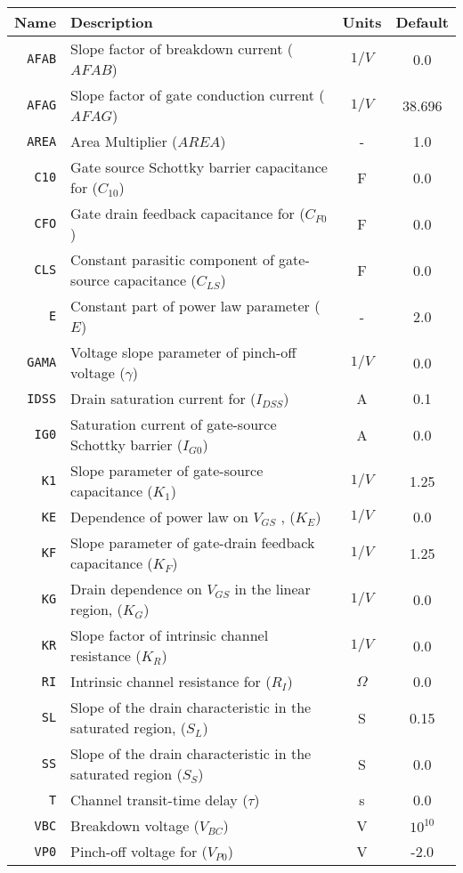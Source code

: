 \documentclass{article}
\begin{document}
\begin{tabular}{|r|l|c|c|}
\hline
\textbf{Name} & \textbf{Description} & \textbf{Units} & \textbf{Default} \\
\hline
\texttt{AFAB} & Slope factor of breakdown current ($AFAB$) & $1/V$ & 0.0 \\
\hline
\texttt{AFAG} & Slope factor of gate conduction current ($AFAG$) & $1/V$ & 38.696 \\
\hline
\texttt{AREA} & Area Multiplier ($AREA$) & - & 1.0 \\
\hline
\texttt{C10} & Gate source Schottky barrier capacitance for ($C_{10}$) & F & 0.0 \\
\hline
\texttt{CFO} & Gate drain feedback capacitance for ($C_{F0}$) & F & 0.0 \\
\hline
\texttt{CLS} & Constant parasitic component of gate-source capacitance ($C_{LS}$) & F & 0.0 \\
\hline
\texttt{E} & Constant part of power law parameter ($E$) & - & 2.0 \\
\hline
\texttt{GAMA} & Voltage slope parameter of pinch-off voltage ($\gamma$) & $1/V$ & 0.0 \\
\hline
\texttt{IDSS} & Drain saturation current for ($I_{DSS}$) & A & 0.1 \\
\hline
\texttt{IG0} & Saturation current of gate-source Schottky barrier ($I_{G0}$) & A & 0.0 \\
\hline
\texttt{K1} & Slope parameter of gate-source capacitance ($K_1$) & $1/V$ & 1.25 \\
\hline
\texttt{KE} & Dependence of power law on $V_{GS}$ , ($K_E$) & $1/V$ & 0.0 \\
\hline
\texttt{KF} & Slope parameter of gate-drain feedback capacitance ($K_F$) & $1/V$ & 1.25 \\
\hline
\texttt{KG} & Drain dependence on $V_{GS}$ in the linear region, ($K_G$) & $1/V$ & 0.0 \\
\hline
\texttt{KR} & Slope factor of intrinsic channel resistance ($K_R$) & $1/V$ & 0.0 \\
\hline
\texttt{RI} & Intrinsic channel resistance for ($R_{I}$) & $\Omega$ & 0.0 \\
\hline
\texttt{SL} & Slope of the drain characteristic in the saturated region, ($S_L$) & S & 0.15 \\
\hline
\texttt{SS} & Slope of the drain characteristic in the saturated region ($S_S$) & S & 0.0 \\
\hline
\texttt{T} & Channel transit-time delay ($\tau$) & s & 0.0 \\
\hline
\texttt{VBC} & Breakdown voltage ($V_{BC}$) & V & $10^{10}$ \\
\hline
\texttt{VP0} & Pinch-off voltage for ($V_{P0}$) & V & -2.0 \\
\hline
\end{tabular}\\[0.05in]
\end{document}
